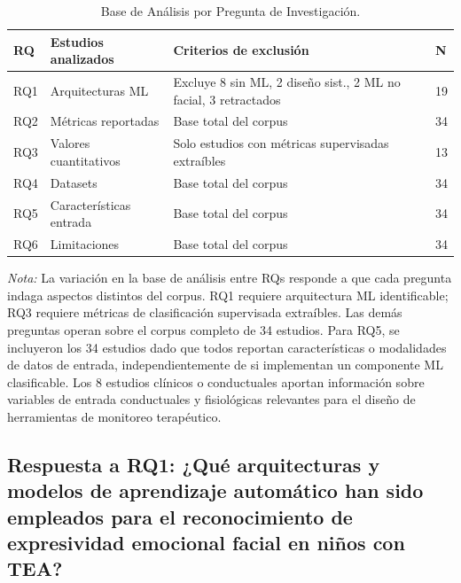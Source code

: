 \documentclass[ASNA,twocolumn]{USG}
\begin{document}
	\begin{table}[!ht]
		\centering
		\caption{Base de Análisis por Pregunta de Investigación.\label{tab6}}
		{\setlength{\tabcolsep}{3pt}
			\begin{tabular*}{\columnwidth}{@{\extracolsep\fill}llll@{\extracolsep\fill}}
				\toprule
				\textbf{RQ} & \textbf{Estudios analizados} & \textbf{Criterios de exclusión} & \textbf{N} \\
				\midrule
				RQ1 & Arquitecturas ML        & \parbox[t]{2.8cm}{Excluye 8 sin ML, 2 diseño sist., 2 ML no facial, 3 retractados} & 19 \\[18pt]
				RQ2 & Métricas reportadas     & Base total del corpus & 34 \\
				RQ3 & Valores cuantitativos   & \parbox[t]{2.8cm}{Solo estudios con métricas supervisadas extraíbles} & 13 \\[12pt]
				RQ4 & Datasets                & Base total del corpus & 34 \\
				RQ5 & Características entrada & Base total del corpus & 34 \\
				RQ6 & Limitaciones            & Base total del corpus & 34 \\
				\bottomrule
		\end{tabular*}}
		\begin{tablenotes}
			\item {\it Nota:} La variación en la base de análisis entre RQs responde a que cada
			pregunta indaga aspectos distintos del corpus. RQ1 requiere arquitectura ML
			identificable; RQ3 requiere métricas de clasificación supervisada extraíbles. Las
			demás preguntas operan sobre el corpus completo de 34 estudios. Para RQ5, se
			incluyeron los 34 estudios dado que todos reportan características o modalidades
			de datos de entrada, independientemente de si implementan un componente ML
			clasificable. Los 8 estudios clínicos o conductuales aportan información sobre
			variables de entrada conductuales y fisiológicas relevantes para el diseño de
			herramientas de monitoreo terapéutico.
		\end{tablenotes}
	\end{table}
	
	\subsection{Respuesta a RQ1: ¿Qué arquitecturas y modelos de aprendizaje
		automático han sido empleados para el reconocimiento de expresividad emocional
		facial en niños con TEA?}\label{sec4a}
	
\end{document}
